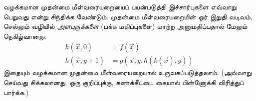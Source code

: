 \documentclass[../../../include/open-logic-section]{subfiles}
\begin{document}
வழக்கமான முதன்மை மீள்வரையறையைப் பயன்படுத்தி இச்சார்புகளை எவ்வாறு
பெறுவது என்று சிந்திக்க வேண்டும். முதன்மை மீள்வரையறையின் ஓர் இறுதி
வடிவம், செல்லும் வழியில் \emph{அளபுருக்களை} (பக்க மதிப்புகளை)
மாற்ற அனுமதிப்பதால் மேலும் நெகிழ்வானது:
\begin{align*}
h(\vec x, 0) & = f(\vec x) \\
h(\vec x, y+1) & = g(\vec x, y, h(k(\vec x), y))
\end{align*}
இதையும் வழக்கமான முதன்மை மீள்வரையறையால் உருவகப்படுத்தலாம்.
(அவ்வாறு செய்வது சிக்கலானது. ஒரு குறிப்புக்கு, கணக்கீட்டை கையால்
பின்னோக்கி விரித்துப் பார்க்க.)
\end{document}
